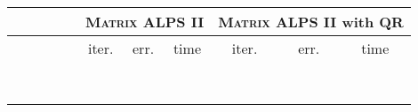 \documentclass[twocolumn]{svjour3}
\begin{document}
\begin{table*}
\begin{center}
\begin{tabular}{|c|c|c|c|c|c|c|c|c|c|c|c|c|c}
\multicolumn{4}{c|}{} & & \multicolumn{3}{|c|}{\textsc{Matrix ALPS II}} & \multicolumn{6}{|c}{\textsc{Matrix ALPS II} with QR}  \\
\hline \hline
\multicolumn{1}{c}{}  & \multicolumn{1}{c}{} & \multicolumn{1}{c}{} & \multicolumn{1}{c|}{} & & 
\multicolumn{1}{|c}{\rm{iter.}} & \multicolumn{1}{c}{\rm{err.}} & \multicolumn{1}{c|}{\rm{time}} &
\multicolumn{2}{|c}{\rm{iter.}} & \multicolumn{2}{c}{\rm{err.}} & \multicolumn{2}{c}{\rm{time}}  \\
\hline\hline
\multicolumn{1}{c}{} & \multicolumn{1}{c}{} & \multicolumn{1}{c}{}  & \multicolumn{1}{c|}{} &  & 
\multicolumn{1}{|c}{} & \multicolumn{1}{c}{} & \multicolumn{1}{c|}{} &
\multicolumn{2}{|c}{} & \multicolumn{2}{c}{} & \multicolumn{2}{c}{} \\
\hline
\multicolumn{1}{c}{} & \multicolumn{1}{c}{} & \multicolumn{1}{c}{}  & \multicolumn{1}{c|}{} &  & 
\multicolumn{1}{|c}{} & \multicolumn{1}{c}{} & \multicolumn{1}{c|}{} &
\multicolumn{2}{|c}{} & \multicolumn{2}{c}{} & \multicolumn{2}{c}{} \\
\hline
\multicolumn{1}{c}{} & \multicolumn{1}{c}{} & \multicolumn{1}{c}{}  & \multicolumn{1}{c|}{} &  & 
\multicolumn{1}{|c}{} & \multicolumn{1}{c}{} & \multicolumn{1}{c|}{} &
\multicolumn{2}{|c}{} & \multicolumn{2}{c}{} & \multicolumn{2}{c}{} \\
\hline
\multicolumn{1}{c}{} & \multicolumn{1}{c}{} & \multicolumn{1}{c}{}  & \multicolumn{1}{c|}{} &  & 
\multicolumn{1}{|c}{} & \multicolumn{1}{c}{} & \multicolumn{1}{c|}{} &
\multicolumn{2}{|c}{} & \multicolumn{2}{c}{} & \multicolumn{2}{c}{} \\
\hline
\multicolumn{1}{c}{} & \multicolumn{1}{c}{} & \multicolumn{1}{c}{}  & \multicolumn{1}{c|}{} &  & 
\multicolumn{1}{|c}{} & \multicolumn{1}{c}{} & \multicolumn{1}{c|}{} &
\multicolumn{2}{|c}{} & \multicolumn{2}{c}{} & \multicolumn{2}{c}{} \\
\hline
\multicolumn{1}{c}{} & \multicolumn{1}{c}{} & \multicolumn{1}{c}{}  & \multicolumn{1}{c|}{} &  & 
\multicolumn{1}{|c}{} & \multicolumn{1}{c}{} & \multicolumn{1}{c|}{} &
\multicolumn{2}{|c}{} & \multicolumn{2}{c}{} & \multicolumn{2}{c}{} \\
\hline
\multicolumn{1}{c}{} & \multicolumn{1}{c}{} & \multicolumn{1}{c}{}  & \multicolumn{1}{c|}{} &  & 
\multicolumn{1}{|c}{} & \multicolumn{1}{c}{} & \multicolumn{1}{c|}{} &
\multicolumn{2}{|c}{} & \multicolumn{2}{c}{} & \multicolumn{2}{c}{} \\
\hline
\multicolumn{1}{c}{} & \multicolumn{1}{c}{} & \multicolumn{1}{c}{}  & \multicolumn{1}{c|}{} &  & 

\end{tabular}
\end{center}
\end{table*}
\end{document}
